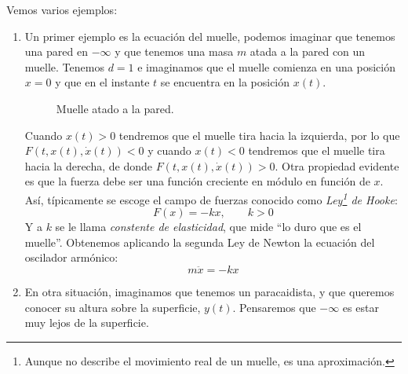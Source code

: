 \begin{ejemplo}
    Vemos varios ejemplos:
    \begin{enumerate}
        \item Un primer ejemplo es la ecuación del muelle, podemos imaginar que tenemos una pared en $-\infty$ y que tenemos una masa $m$ atada a la pared con un muelle. Tenemos $d=1$ e imaginamos que el muelle comienza en una posición $x=0$ y que en el instante $t$ se encuentra en la posición $x(t)$.

            \begin{figure}[H]
                \centering
            \caption{Muelle atado a la pared.}
            \label{fig:muelle}
            \end{figure}

            \noindent
            Cuando $x(t) > 0$ tendremos que el muelle tira hacia la izquierda, por lo que $F(t,x(t),\dot{x}(t)) < 0$ y cuando $x(t) < 0$ tendremos que el muelle tira hacia la derecha, de donde $F(t,x(t),\dot{x}(t)) > 0$. Otra propiedad evidente es que la fuerza debe ser una función creciente en módulo en función de $x$. Así, típicamente se escoge el campo de fuerzas conocido como \textit{Ley\footnote{Aunque no describe el movimiento real de un muelle, es una aproximación.} de Hooke}:
            \begin{equation*}
                F(x) = -kx, \qquad k>0
            \end{equation*}
            Y a $k$ se le llama \textit{constente de elasticidad}, que mide ``lo duro que es el muelle''. Obtenemos aplicando la segunda Ley de Newton la ecuación del oscilador armónico:
            \begin{equation*}
                m\ddot{x} = -kx
            \end{equation*}
        \item En otra situación, imaginamos que tenemos un paracaidista, y que queremos conocer su altura sobre la superficie, $y(t)$. Pensaremos que $-\infty$ es estar muy lejos de la superficie.


\end{enumerate}
\end{ejemplo}
